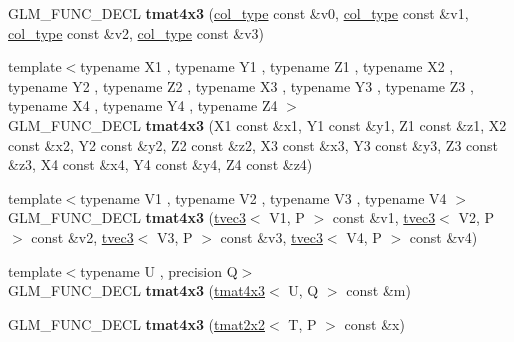 \begin{DoxyCompactItemize}
\item 
\hypertarget{structglm_1_1detail_1_1tmat4x3_a5783ce8745f4ea713c2c1cde65154aaf}{G\-L\-M\-\_\-\-F\-U\-N\-C\-\_\-\-D\-E\-C\-L {\bfseries tmat4x3} (\hyperlink{structglm_1_1detail_1_1tvec3}{col\-\_\-type} const \&v0, \hyperlink{structglm_1_1detail_1_1tvec3}{col\-\_\-type} const \&v1, \hyperlink{structglm_1_1detail_1_1tvec3}{col\-\_\-type} const \&v2, \hyperlink{structglm_1_1detail_1_1tvec3}{col\-\_\-type} const \&v3)}\label{structglm_1_1detail_1_1tmat4x3_a5783ce8745f4ea713c2c1cde65154aaf}

\item 
\hypertarget{structglm_1_1detail_1_1tmat4x3_acca51e285af4cb8da90b02a67daadf05}{{\footnotesize template$<$typename X1 , typename Y1 , typename Z1 , typename X2 , typename Y2 , typename Z2 , typename X3 , typename Y3 , typename Z3 , typename X4 , typename Y4 , typename Z4 $>$ }\\G\-L\-M\-\_\-\-F\-U\-N\-C\-\_\-\-D\-E\-C\-L {\bfseries tmat4x3} (X1 const \&x1, Y1 const \&y1, Z1 const \&z1, X2 const \&x2, Y2 const \&y2, Z2 const \&z2, X3 const \&x3, Y3 const \&y3, Z3 const \&z3, X4 const \&x4, Y4 const \&y4, Z4 const \&z4)}\label{structglm_1_1detail_1_1tmat4x3_acca51e285af4cb8da90b02a67daadf05}

\item 
\hypertarget{structglm_1_1detail_1_1tmat4x3_a8ef04c1736662e7373db390d7351114f}{{\footnotesize template$<$typename V1 , typename V2 , typename V3 , typename V4 $>$ }\\G\-L\-M\-\_\-\-F\-U\-N\-C\-\_\-\-D\-E\-C\-L {\bfseries tmat4x3} (\hyperlink{structglm_1_1detail_1_1tvec3}{tvec3}$<$ V1, P $>$ const \&v1, \hyperlink{structglm_1_1detail_1_1tvec3}{tvec3}$<$ V2, P $>$ const \&v2, \hyperlink{structglm_1_1detail_1_1tvec3}{tvec3}$<$ V3, P $>$ const \&v3, \hyperlink{structglm_1_1detail_1_1tvec3}{tvec3}$<$ V4, P $>$ const \&v4)}\label{structglm_1_1detail_1_1tmat4x3_a8ef04c1736662e7373db390d7351114f}

\item 
\hypertarget{structglm_1_1detail_1_1tmat4x3_a1544dbd7a57f8c8d9ee9cbeb4e62bd3a}{{\footnotesize template$<$typename U , precision Q$>$ }\\G\-L\-M\-\_\-\-F\-U\-N\-C\-\_\-\-D\-E\-C\-L {\bfseries tmat4x3} (\hyperlink{structglm_1_1detail_1_1tmat4x3}{tmat4x3}$<$ U, Q $>$ const \&m)}\label{structglm_1_1detail_1_1tmat4x3_a1544dbd7a57f8c8d9ee9cbeb4e62bd3a}

\item 
\hypertarget{structglm_1_1detail_1_1tmat4x3_a15e5f3c44fc8d0b02c1a507e740d2359}{G\-L\-M\-\_\-\-F\-U\-N\-C\-\_\-\-D\-E\-C\-L {\bfseries tmat4x3} (\hyperlink{structglm_1_1detail_1_1tmat2x2}{tmat2x2}$<$ T, P $>$ const \&x)}\label{structglm_1_1detail_1_1tmat4x3_a15e5f3c44fc8d0b02c1a507e740d2359}


\end{DoxyCompactItemize}
